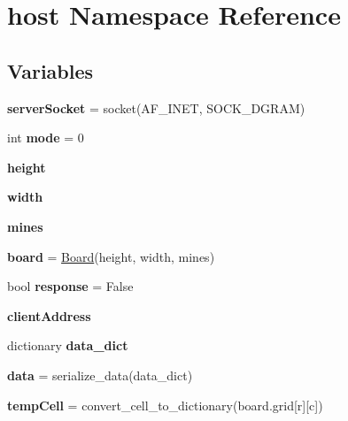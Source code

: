 \hypertarget{namespacehost}{}\section{host Namespace Reference}
\label{namespacehost}
\subsection*{Variables}
\begin{DoxyCompactItemize}
\item 
\mbox{\label{namespacehost_a2f80dadba484200e570a76f7da6be649}} 
{\bfseries server\+Socket} = socket(A\+F\+\_\+\+I\+N\+ET, S\+O\+C\+K\+\_\+\+D\+G\+R\+AM)
\item 
\mbox{\label{namespacehost_a5f6106680a6c6401191db0633d1af66f}} 
int {\bfseries mode} = 0
\item 
\mbox{\label{namespacehost_a54fb6ea367ea77b46ec4c7c5039a5ee2}} 
{\bfseries height}
\item 
\mbox{\label{namespacehost_acd576bc5fea4a55f91c3a6caacaf5fa5}} 
{\bfseries width}
\item 
\mbox{\label{namespacehost_a5ce4996febf6a1d8a3f15308021151b1}} 
{\bfseries mines}
\item 
\mbox{\label{namespacehost_ab2757d06fb4592190609a0514d9e4ffd}} 
{\bfseries board} = \hyperlink{class_board_1_1_board}{Board}(height, width, mines)
\item 
\mbox{\label{namespacehost_aae86faa74ad32fcf0ecf13de2667a52a}} 
bool {\bfseries response} = False
\item 
\mbox{\label{namespacehost_aedee2c2f1424cd07fcb9a97263ff6b2e}} 
{\bfseries client\+Address}
\item 
dictionary {\bfseries data\+\_\+dict}
\item 
\mbox{\label{namespacehost_a50c4cab8ef7df36e4ed8fb1ca388eb18}} 
{\bfseries data} = serialize\+\_\+data(data\+\_\+dict)
\item 
\mbox{\label{namespacehost_a9b9415201f6e29d0eda621113efe49ba}} 
{\bfseries temp\+Cell} = convert\+\_\+cell\+\_\+to\+\_\+dictionary(board.\+grid\mbox{[}r\mbox{]}\mbox{[}c\mbox{]})
\end{DoxyCompactItemize}


